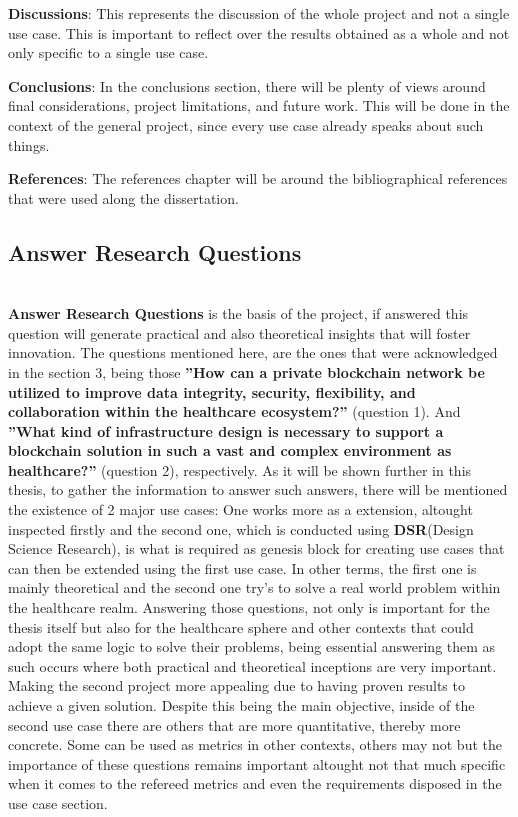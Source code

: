 \textbf{Discussions}: This represents the discussion of the whole project and not a single use case. This is
 important to reflect over the results obtained as a whole and not only specific to a single use case.

\textbf {Conclusions}: In the conclusions section, there will be plenty of views around final considerations, 
project limitations, and future work. This will be done in the context of the general project, since every use 
case already speaks about such things.

\textbf{References}: The references chapter will be around the bibliographical references that were 
used along the dissertation.

\subsection{Answer Research Questions}\mbox{}\\
\textbf{Answer Research Questions} is the basis of the project, if answered this question will generate 
practical and also theoretical insights that will foster innovation. The questions mentioned here, are the ones 
that were acknowledged in the section 3, being those \textbf{”How can a private blockchain network be utilized to
improve data integrity, security, flexibility, and collaboration within the healthcare ecosystem?”} 
(question 1). And \textbf{”What kind of infrastructure design is necessary to support a blockchain solution 
in such a vast and complex environment as healthcare?”} (question 2), respectively. As it will be shown further 
in this thesis, to gather the information to answer such answers, there will be mentioned the existence of 2 major
use cases: One works more as a extension, altought inspected firstly and the second one, which is conducted using 
\textbf{DSR}(Design Science Research), is what is required as genesis block for creating use cases that can then 
be extended using the first use case. In other terms, the first one is mainly theoretical and the second one 
try's to solve a real world problem within the healthcare realm. Answering those questions, not only is important 
for the thesis itself but also for the healthcare sphere and other contexts that could adopt the same logic to 
solve their problems, being essential answering them as such occurs where both practical and theoretical 
inceptions are very important. Making the second project more appealing due to having proven results to achieve a 
given solution.
Despite this being the main objective, inside of the second use case there are others that are more quantitative, 
thereby more concrete. Some can be used as metrics in other contexts, others may not but the importance of these 
questions remains important altought not that much specific when it comes to the refereed metrics and even the 
requirements disposed in the use case section.


